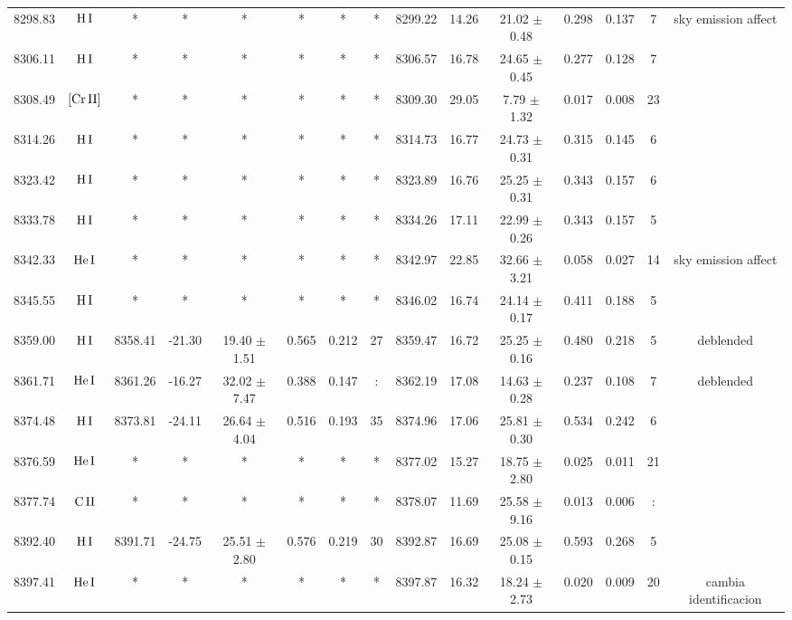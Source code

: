 \documentclass{article}
\begin{document}
\begin{table*}
\begin{adjustbox}{width=\textwidth}
\begin{tabular}{ccccccccccccccc}
8298.83 & $\mbox{H}\thinspace \mbox{I}$ & * & * & * & * & * & * & 8299.22 & 14.26 & 21.02 $\pm$ 0.48 & 0.298 & 0.137 & 7 &  sky emission affect \\
8306.11 & $\mbox{H}\thinspace \mbox{I}$ & * & * & * & * & * & * & 8306.57 & 16.78 & 24.65 $\pm$ 0.45 & 0.277 & 0.128 & 7 &  \\
8308.49 & $\mbox{[Cr}\thinspace \mbox{II]}$ & * & * & * & * & * & * & 8309.30 & 29.05 & 7.79 $\pm$ 1.32 & 0.017 & 0.008 & 23 &  \\
8314.26 & $\mbox{H}\thinspace \mbox{I}$ & * & * & * & * & * & * & 8314.73 & 16.77 & 24.73 $\pm$ 0.31 & 0.315 & 0.145 & 6 &  \\
8323.42 & $\mbox{H}\thinspace \mbox{I}$ & * & * & * & * & * & * & 8323.89 & 16.76 & 25.25 $\pm$ 0.31 & 0.343 & 0.157 & 6 &  \\
8333.78 & $\mbox{H}\thinspace \mbox{I}$ & * & * & * & * & * & * & 8334.26 & 17.11 & 22.99 $\pm$ 0.26 & 0.343 & 0.157 & 5 &  \\
8342.33 & $\mbox{He}\thinspace \mbox{I}$ & * & * & * & * & * & * & 8342.97 & 22.85 & 32.66 $\pm$ 3.21 & 0.058 & 0.027 & 14 &  sky emission affect \\
8345.55 & $\mbox{H}\thinspace \mbox{I}$ & * & * & * & * & * & * & 8346.02 & 16.74 & 24.14 $\pm$ 0.17 & 0.411 & 0.188 & 5 &  \\
8359.00 & $\mbox{H}\thinspace \mbox{I}$ & 8358.41 & -21.30 & 19.40 $\pm$ 1.51 & 0.565 & 0.212 & 27 & 8359.47 & 16.72 & 25.25 $\pm$ 0.16 & 0.480 & 0.218 & 5 &  deblended \\
8361.71 & $\mbox{He}\thinspace \mbox{I}$ & 8361.26 & -16.27 & 32.02 $\pm$ 7.47 & 0.388 & 0.147 & : & 8362.19 & 17.08 & 14.63 $\pm$ 0.28 & 0.237 & 0.108 & 7 &  deblended \\
8374.48 & $\mbox{H}\thinspace \mbox{I}$ & 8373.81 & -24.11 & 26.64 $\pm$ 4.04 & 0.516 & 0.193 & 35 & 8374.96 & 17.06 & 25.81 $\pm$ 0.30 & 0.534 & 0.242 & 6 &  \\
8376.59 & $\mbox{He}\thinspace \mbox{I}$ & * & * & * & * & * & * & 8377.02 & 15.27 & 18.75 $\pm$ 2.80 & 0.025 & 0.011 & 21 &  \\
8377.74 & $\mbox{C}\thinspace \mbox{II}$ & * & * & * & * & * & * & 8378.07 & 11.69 & 25.58 $\pm$ 9.16 & 0.013 & 0.006 & : &  \\
8392.40 & $\mbox{H}\thinspace \mbox{I}$ & 8391.71 & -24.75 & 25.51 $\pm$ 2.80 & 0.576 & 0.219 & 30 & 8392.87 & 16.69 & 25.08 $\pm$ 0.15 & 0.593 & 0.268 & 5 &  \\
8397.41 & $\mbox{He}\thinspace \mbox{I}$ & * & * & * & * & * & * & 8397.87 & 16.32 & 18.24 $\pm$ 2.73 & 0.020 & 0.009 & 20 &  cambia identificacion \\

\end{tabular}
\end{adjustbox}
\end{table*}
\end{document}
